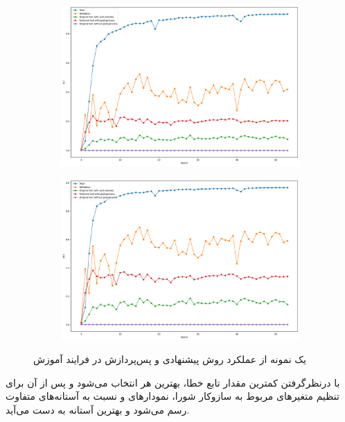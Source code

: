  \begin{figure}[h!]
 		\centering %
 		\begin{subfigure}{0.49\textwidth}
 			\includegraphics[width=\linewidth]{Images/Chapter3/seg-IoU-metrics.png}
 			\caption{}
 			\label{fig:ch3-seg-IoU}
 		\end{subfigure}\hfil %
 		\begin{subfigure}{0.49\textwidth}
 			\includegraphics[width=\linewidth]{Images/Chapter3/seg-Dice-metrics.png.png}
 			\caption{}
 			\label{fig:ch3-seg-Dice}
 		\end{subfigure}\hfil %
 		\caption{یک نمونه از عملکرد روش پیشنهادی و پس‌پردازش در فرایند آموزش }
 		\label{fig:ch3-seg-training-graph}
 \end{figure}
 
 با درنظرگرفتن کمترین مقدار تابع خطا، بهترین
 هر 
 انتخاب می‌شود و پس از آن برای تنظیم متغیرهای مربوط به سازوکار شورا، نمودارهای 
 و 
 نسبت به آستانه‌های متفاوت رسم می‌شود و بهترین آستانه به دست می‌آید.
 
